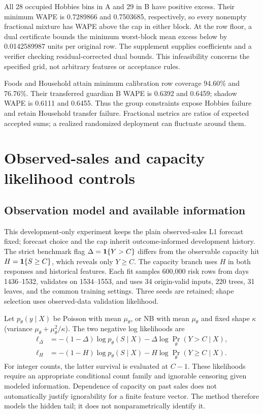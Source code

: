 All 28 occupied Hobbies bins in A and 29 in B have positive excess. Their minimum WAPE is 0.7289866 and 0.7503685, respectively, so every nonempty fractional mixture has WAPE above the cap in either block. At the row floor, a dual certificate bounds the minimum worst-block mean excess below by 0.0142589987 units per original row. The supplement supplies coefficients and a verifier checking residual-corrected dual bounds. This infeasibility concerns the specified grid, not arbitrary features or acceptance rules.

Foods and Household attain minimum calibration row coverage 94.60\% and 76.76\%. Their transferred guardian B WAPE is 0.6392 and 0.6459; shadow WAPE is 0.6111 and 0.6455. Thus the group constraints expose Hobbies failure and retain Household transfer failure. Fractional metrics are ratios of expected accepted sums; a realized randomized deployment can fluctuate around them.

\section{Observed-sales and capacity likelihood controls}
\label{app:observable}

\subsection{Observation model and available information}
This development-only experiment keeps the plain observed-sales L1 forecast fixed; forecast choice and the cap inherit outcome-informed development history. The strict benchmark flag $\Delta=\mathbf{1}\{Y>C\}$ differs from the observable capacity hit $H=\mathbf{1}\{S\geq C\}$, which reveals only $Y\geq C$. The capacity branch uses $H$ in both responses and historical features. Each fit samples 600,000 risk rows from days 1436--1532, validates on 1534--1553, and uses 34 origin-valid inputs, 220 trees, 31 leaves, and the common training settings. Three seeds are retained; shape selection uses observed-data validation likelihood.

Let $p_\theta(y\mid X)$ be Poisson with mean $\mu_\theta$, or NB with mean $\mu_\theta$ and fixed shape $\kappa$ (variance $\mu_\theta+\mu_\theta^2/\kappa$). The two negative log likelihoods are
\begin{align*}
 \ell_\Delta&=-(1-\Delta)\log p_\theta(S\mid X)-\Delta\log\Pr_\theta(Y>C\mid X),\\
 \ell_H&=-(1-H)\log p_\theta(S\mid X)-H\log\Pr_\theta(Y\geq C\mid X).
\end{align*}
For integer counts, the latter survival is evaluated at $C-1$. These likelihoods require an appropriate conditional count family and ignorable censoring given modeled information. Dependence of capacity on past sales does not automatically justify ignorability for a finite feature vector. The method therefore models the hidden tail; it does not nonparametrically identify it.

